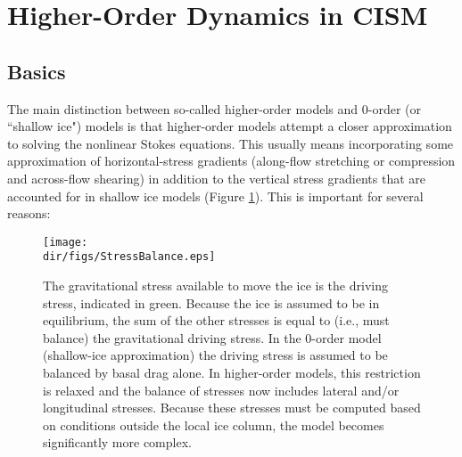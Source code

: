
\section{Higher-Order Dynamics in CISM}
\label{sc:higher-order-into}

\subsection{Basics}
The main distinction between so-called higher-order models and 0-order (or ``shallow ice") models is that higher-order models attempt a closer approximation to solving the nonlinear Stokes equations. This usually means incorporating some approximation of horizontal-stress gradients (along-flow stretching or compression and across-flow shearing) in addition to the vertical stress gradients that are accounted for in shallow ice models (Figure \ref{fig:stressbalance}). This is important for several reasons:

\begin{figure}
  \begin{center}
    \texttt{[image: \\dir/figs/StressBalance.eps]}
  \end{center}
  \caption{The gravitational stress available to move the ice is the driving stress, indicated in green. Because the ice is assumed to be in equilibrium, the sum of the other stresses is equal to (i.e., must balance) the gravitational driving stress. In the 0-order model (shallow-ice approximation) the driving stress is assumed to be balanced by basal drag alone. In higher-order models, this restriction is relaxed and the balance of stresses now includes lateral and/or longitudinal stresses. Because these stresses must be computed based on conditions outside the local ice column, the model becomes significantly more complex.}
  \label{fig:stressbalance}
\end{figure} 

